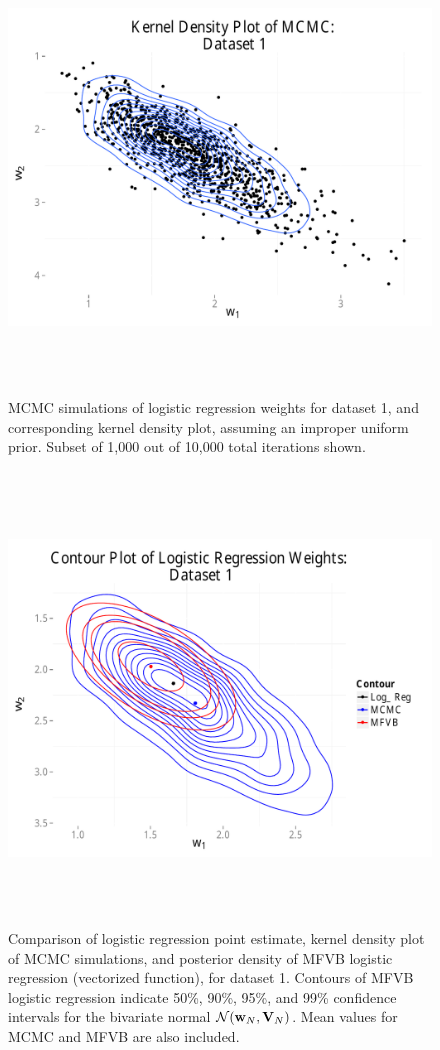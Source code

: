 \begin{figure}
\centering
	\includegraphics[height=120mm]{figures/mcmc_uniform_2d.pdf}
    \caption{MCMC simulations of logistic regression weights for dataset 1, and corresponding kernel density plot, assuming 
    an improper uniform prior.  Subset of 1,000 out of 10,000 total iterations shown.}  \label{fig:mcmc_kernel}  
\end{figure}

\begin{figure}
\centering
	\includegraphics[height=120mm]{figures/mcmc_uniform_mfvb.pdf}
    \caption{Comparison of logistic regression point estimate, kernel density plot of MCMC simulations, and posterior density of
    MFVB logistic regression (vectorized function), for dataset 1.   Contours of MFVB logistic regression indicate
    50\%, 90\%, 95\%, and 99\% confidence intervals for the bivariate normal $\mathcal{N}(\boldsymbol{\mathbf{w}}_{N},\boldsymbol{\mathbf{V}}_N)$.
    Mean values for MCMC and MFVB are also included.}  \label{fig:mcmc_mfvb}  
\end{figure}